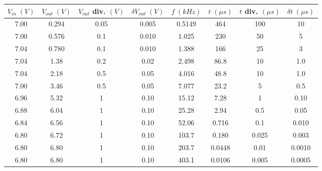 \begin{tabular}{c|ccc|cccc}
\toprule
$V_{in} \; (V)$ & $V_{out} \; (V)$ & $V_{out}$ div. $(V)$ & $\delta V_{out} \; (V)$ & $f \; (kHz)$ & $t \; (\mu s)$ & $t$ div. $(\mu s)$ & $\delta t \; (\mu s)$ \\
\midrule
           7.00 &               0.294 &        0.05 &         0.005 &       0.5149 &            464 &               100  &              10 \\
           7.00 &               0.576 &         0.1 &         0.010 &        1.025 &            230 &                 50 &               5 \\
           7.04 &               0.780 &         0.1 &         0.010 &        1.388 &            166 &                 25 &               3 \\
           7.04 &                1.38 &         0.2 &          0.02 &        2.498 &           86.8 &                 10 &             1.0 \\
           7.04 &                2.18 &         0.5 &          0.05 &        4.016 &           48.8 &                 10 &             1.0 \\
           7.00 &                3.46 &         0.5 &          0.05 &        7.077 &           23.2 &                  5 &             0.5 \\
           6.96 &                5.32 &           1 &          0.10 &        15.12 &           7.28 &                  1 &            0.10 \\
           6.88 &                6.04 &           1 &          0.10 &        25.28 &           2.94 &                0.5 &            0.05 \\
           6.84 &                6.56 &           1 &          0.10 &        52.06 &          0.716 &                0.1 &           0.010 \\
           6.80 &                6.72 &           1 &          0.10 &        103.7 &          0.180 &              0.025 &           0.003 \\
           6.80 &                6.80 &           1 &          0.10 &        203.7 &         0.0448 &               0.01 &          0.0010 \\
           6.80 &                6.80 &           1 &          0.10 &        403.1 &         0.0106 &              0.005 &          0.0005 \\
\bottomrule
\end{tabular}
